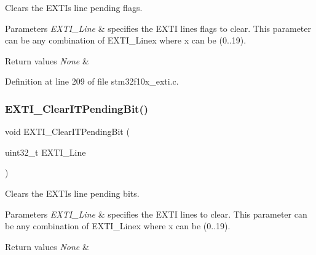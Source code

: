 Clears the E\+X\+TI\textquotesingle{}s line pending flags. 


\begin{DoxyParams}{Parameters}
{\em E\+X\+T\+I\+\_\+\+Line} & specifies the E\+X\+TI lines flags to clear. This parameter can be any combination of E\+X\+T\+I\+\_\+\+Linex where x can be (0..19). \\
\hline
\end{DoxyParams}

\begin{DoxyRetVals}{Return values}
{\em None} & \\
\hline
\end{DoxyRetVals}


Definition at line 209 of file stm32f10x\+\_\+exti.\+c.

\mbox{\label{group___e_x_t_i___private___functions_ga3652a7e682728b310c124e7e974d1468}} 
\subsubsection{\texorpdfstring{E\+X\+T\+I\+\_\+\+Clear\+I\+T\+Pending\+Bit()}{EXTI\_ClearITPendingBit()}}
{\footnotesize\ttfamily void E\+X\+T\+I\+\_\+\+Clear\+I\+T\+Pending\+Bit (\begin{DoxyParamCaption}\item[{uint32\+\_\+t}]{E\+X\+T\+I\+\_\+\+Line }\end{DoxyParamCaption})}



Clears the E\+X\+TI\textquotesingle{}s line pending bits. 


\begin{DoxyParams}{Parameters}
{\em E\+X\+T\+I\+\_\+\+Line} & specifies the E\+X\+TI lines to clear. This parameter can be any combination of E\+X\+T\+I\+\_\+\+Linex where x can be (0..19). \\
\hline
\end{DoxyParams}

\begin{DoxyRetVals}{Return values}
{\em None} & \\
\hline
\end{DoxyRetVals}


